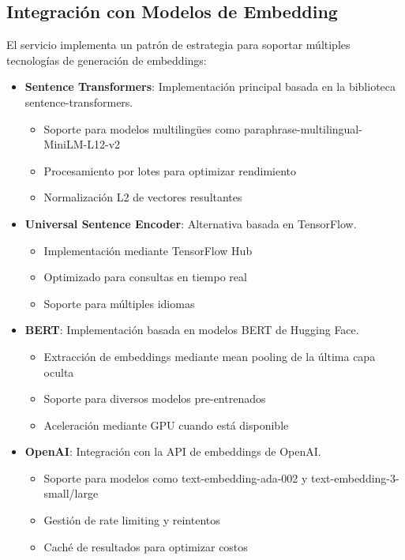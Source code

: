 \documentclass[12pt,a4paper]{article}
\begin{document}
\subsection{Integración con Modelos de Embedding}
\label{subsec:ss-modelos}

El servicio implementa un patrón de estrategia para soportar múltiples tecnologías de generación de embeddings:

\begin{itemize}
    \item \textbf{Sentence Transformers}: Implementación principal basada en la biblioteca sentence-transformers.
    \begin{itemize}
        \item Soporte para modelos multilingües como paraphrase-multilingual-MiniLM-L12-v2
        \item Procesamiento por lotes para optimizar rendimiento
        \item Normalización L2 de vectores resultantes
    \end{itemize}
    
    \item \textbf{Universal Sentence Encoder}: Alternativa basada en TensorFlow.
    \begin{itemize}
        \item Implementación mediante TensorFlow Hub
        \item Optimizado para consultas en tiempo real
        \item Soporte para múltiples idiomas
    \end{itemize}
    
    \item \textbf{BERT}: Implementación basada en modelos BERT de Hugging Face.
    \begin{itemize}
        \item Extracción de embeddings mediante mean pooling de la última capa oculta
        \item Soporte para diversos modelos pre-entrenados
        \item Aceleración mediante GPU cuando está disponible
    \end{itemize}
    
    \item \textbf{OpenAI}: Integración con la API de embeddings de OpenAI.
    \begin{itemize}
        \item Soporte para modelos como text-embedding-ada-002 y text-embedding-3-small/large
        \item Gestión de rate limiting y reintentos
        \item Caché de resultados para optimizar costos
    \end{itemize}
\end{itemize}
\end{document}
